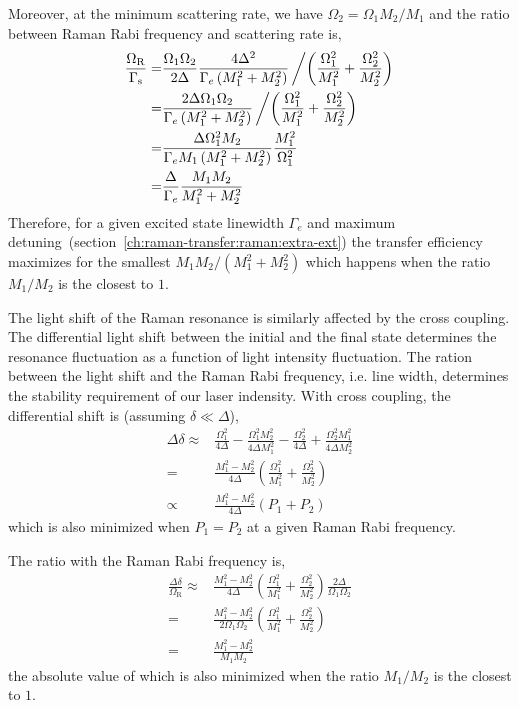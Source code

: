 Moreover, at the minimum scattering rate, we have $\Omega_2=\Omega_1M_2/M_1$
and the ratio between Raman Rabi frequency and scattering rate is,
\begin{align*}
  \frac{\Omega_{\mathrm{R}}}{\Gamma_{\mathrm{s}}}=&\frac{\Omega_1\Omega_2}{2\Delta}\frac{4\Delta^2}{\Gamma_e\left(M_1^2+M_2^2\right)}\left/\left(\frac{\Omega_1^2}{M_1^2}+\frac{\Omega_2^2}{M_2^2}\right)\right.\\
  =&\frac{2\Delta\Omega_1\Omega_2}{\Gamma_e\left(M_1^2+M_2^2\right)}\left/\left(\frac{\Omega_1^2}{M_1^2}+\frac{\Omega_2^2}{M_2^2}\right)\right.\\
  =&\frac{\Delta\Omega_1^2M_2}{\Gamma_eM_1\left(M_1^2+M_2^2\right)}\frac{M_1^2}{\Omega_1^2}\\
  =&\frac{\Delta}{\Gamma_e}\frac{M_1M_2}{M_1^2+M_2^2}
\end{align*}
Therefore, for a given excited state linewidth $\Gamma_e$
and maximum detuning~(section~\ref{ch:raman-transfer:raman:extra-ext}) the transfer efficiency
maximizes for the smallest $M_1M_2/(M_1^2+M_2^2)$ which happens when the ratio
$M_1/M_2$ is the closest to $1$.

The light shift of the Raman resonance is similarly affected by the cross coupling.
The differential light shift between the initial and the final state determines
the resonance fluctuation as a function of light intensity fluctuation.
The ration between the light shift and the Raman Rabi frequency, i.e. line width,
determines the stability requirement of our laser indensity.
With cross coupling, the differential shift is (assuming $\delta\ll\Delta$),
\begin{align*}
  \Delta\delta\approx&\frac{\Omega_1^2}{4\Delta}-\frac{\Omega_1^2M_2^2}{4\Delta M_1^2}-\frac{\Omega_2^2}{4\Delta}+\frac{\Omega_2^2M_1^2}{4\Delta M_2^2}\\
  =&\frac{M_1^2-M_2^2}{4\Delta}\left(\frac{\Omega_1^2}{M_1^2}+\frac{\Omega_2^2}{M_2^2}\right)\\
  \propto&\frac{M_1^2-M_2^2}{4\Delta}\left(P_1+P_2\right)
\end{align*}
which is also minimized when $P_1=P_2$ at a given Raman Rabi frequency.

The ratio with the Raman Rabi frequency is,
\begin{align*}
  \frac{\Delta\delta}{\Omega_{\mathrm{R}}}\approx&\frac{M_1^2-M_2^2}{4\Delta}\left(\frac{\Omega_1^2}{M_1^2}+\frac{\Omega_2^2}{M_2^2}\right)\frac{2\Delta}{\Omega_1\Omega_2}\\
  =&\frac{M_1^2-M_2^2}{2\Omega_1\Omega_2}\left(\frac{\Omega_1^2}{M_1^2}+\frac{\Omega_2^2}{M_2^2}\right)\\
  =&\frac{M_1^2-M_2^2}{M_1M_2}
\end{align*}
the absolute value of which is also minimized when the ratio $M_1/M_2$ is the closest to $1$.

